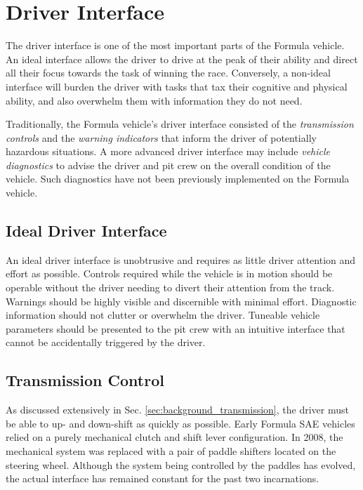 \section{Driver Interface}

The driver interface is one of the most important parts of the Formula vehicle. An ideal interface allows the driver to drive at the peak of their ability and direct all their focus towards the task of winning the race. Conversely, a non-ideal interface will burden the driver with tasks that tax their cognitive and physical ability, and also overwhelm them with information they do not need.

Traditionally, the Formula vehicle's driver interface consisted of the \emph{transmission controls} and the \emph{warning indicators} that inform the driver of potentially hazardous situations. A more advanced driver interface may include \emph{vehicle diagnostics} to advise the driver and pit crew on the overall condition of the vehicle. Such diagnostics have not been previously implemented on the Formula vehicle.

\subsection{Ideal Driver Interface}

An ideal driver interface is unobtrusive and requires as little driver attention and effort as possible. Controls required while the vehicle is in motion should be operable without the driver needing to divert their attention from the track. Warnings should be highly visible and discernible with minimal effort. Diagnostic information should not clutter or overwhelm the driver. Tuneable vehicle parameters should be presented to the pit crew with an intuitive interface that cannot be accidentally triggered by the driver.

\subsection{Transmission Control}

As discussed extensively in Sec. \ref{sec:background_transmission}, the driver must be able to up- and down-shift as quickly as possible. Early Formula SAE vehicles relied on a purely mechanical clutch and shift lever configuration. In 2008, the mechanical system was replaced with a pair of paddle shifters located on the steering wheel. Although the system being controlled by the paddles has evolved, the actual interface has remained constant for the past two incarnations.

